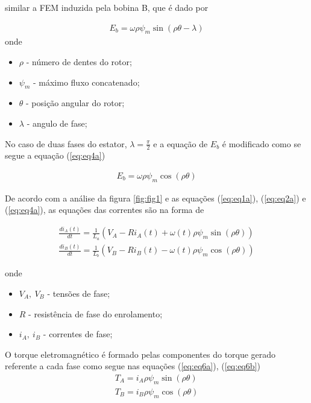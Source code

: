 similar a FEM induzida pela bobina B, que é dado por

\begin{eqnarray}
		\label{eq:eq3a}
		E_b = \omega \rho \psi_m \sin(\rho \theta - \lambda)
\end{eqnarray}
onde
\begin{itemize}
	\item $\rho$ - número de dentes do rotor; \\
	\item $\psi_m$ - máximo fluxo concatenado; \\
	\item $\theta$ - posição angular do rotor; \\
	\item $\lambda$ - angulo de fase; \\
\end{itemize}

No caso de duas fases do estator, $\lambda = \frac{\pi}{2}$ e a equação de $E_b$ é modificado como se segue a equação (\ref{eq:eq4a})

\begin{eqnarray}
		\label{eq:eq4a}
		E_b = \omega \rho \psi_m \cos(\rho \theta )
\end{eqnarray}

De acordo com a análise da figura \ref{fig:fig1} e as equações (\ref{eq:eq1a}), (\ref{eq:eq2a}) e (\ref{eq:eq4a}), as equações das correntes são na forma de

\begin{eqnarray}
	\label{eq:eq5a}
	\frac{d i_A(t)}{dt} = \frac{1}{L_a}\left(V_A - Ri_A(t) + \omega(t) \rho \psi_m \sin(\rho \theta) \right) \\
	\label{eq:eq5b}
	\frac{d i_B(t)}{dt} = \frac{1}{L_b}\left(V_B - Ri_B(t) - \omega(t) \rho \psi_m \cos(\rho \theta) \right) 
\end{eqnarray}

onde
\begin{itemize}
	\item $V_A,\ V_B$ - tensões de fase; \\
	\item $R$ - resistência de fase do enrolamento; \\
	\item $i_A,\ i_B$ - correntes de fase;\\
\end{itemize}

O torque eletromagnético é formado pelas componentes do torque gerado referente a cada fase como segue nas equações (\ref{eq:eq6a}), (\ref{eq:eq6b})
\begin{eqnarray}
\label{eq:eq6a}
T_A = i_A \rho \psi_m \sin(\rho \theta)\\
\label{eq:eq6b}
T_B = i_B \rho \psi_m \cos(\rho \theta) 
\end{eqnarray}

